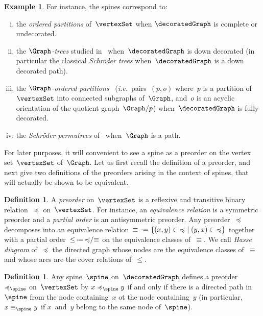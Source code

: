 \documentclass{amsart}
\theoremstyle{definition}
\newtheorem{definition}[theorem]{Definition}
\newtheorem{example}[theorem]{Example}
\newcommand{\set}[2]{\left\{ #1 \;\middle|\; #2 \right\}} %
\newcommand{\eqdef}{\mbox{\,\raisebox{0.2ex}{\scriptsize\ensuremath{\mathrm:}}\ensuremath{=}\,}} %
\newcommand{\ie}{\textit{i.e.}~} %
\newcommand{\darkblue}{\color{darkblue}} %
\newcommand{\defn}[1]{\textsl{\darkblue #1}} %
\newcommand{\vincent}[1]{\todo[color=blue!30]{#1 \\ \hfill --- V.}}
\begin{document}
\begin{example}
  \label{exm:spines}
  For instance, the spines correspond to:
  \vincent{todo: other ideas?}
  \begin{enumerate}[(i)]
    \item the \defn{ordered partitions} of~$\vertexSet$ when $\decoratedGraph$ is complete or undecorated.
    \item the \defn{$\Graph$-trees} studied in~\cite{Postnikov} when~$\decoratedGraph$ is down decorated (in particular the classical \defn{Schr\"oder trees} when~$\decoratedGraph$ is a down decorated path).
    \item the \defn{$\Graph$-ordered partitions}~\cite{Pilaud-acyclicReorientationLattices} (\ie pairs~$(p,o)$ where~$p$ is a partition of~$\vertexSet$ into connected subgraphs of~$\Graph$, and~$o$ is an acyclic orientation of the quotient graph~$\Graph/p$) when~$\decoratedGraph$ is fully decorated.
    \item the \defn{Schr\"oder permutrees} of~\cite{PilaudPons-permutrees} when~$\Graph$ is a path.
  \end{enumerate}
\end{example}

For later purposes, it will convenient to see a spine as a preorder on the vertex set~$\vertexSet$ of~$\Graph$.
Let us first recall the definition of a preorder, and next give two definitions of the preorders arising in the context of spines, that will actually be shown to be equivalent.

\begin{definition}
  \label{def:preorder}
  A \defn{preorder} on~$\vertexSet$ is a reflexive and transitive binary relation~$\preccurlyeq$ on~$\vertexSet$.
  For instance, an \defn{equivalence relation} is a symmetric preorder and a \defn{partial order} is an antisymmetric preorder.
  Any preorder~$\preccurlyeq$ decomposes into an equivalence relation~$\equiv \eqdef \set{(x,y) \in {\preccurlyeq}}{(y,x) \in {\preccurlyeq}}$ together with a partial order~${\le} \eqdef {\preccurlyeq}/{\equiv}$ on the equivalence classes of~$\equiv$.
  We call \defn{Hasse diagram} of~$\preccurlyeq$ the directed graph whose nodes are the equivalence classes of~$\equiv$ and whose arcs are the cover relations of~$\le$.
\end{definition}

\begin{definition}
  \label{def:spinePreorder1}
  Any spine~$\spine$ on~$\decoratedGraph$ defines a preorder~$\preccurlyeq_{\spine}$ on~$\vertexSet$ by $x \preccurlyeq_{\spine} y$ if and only if there is a directed path in~$\spine$ from the node containing~$x$ ot the node containing~$y$ (in particular, $x \equiv_{\spine} y$ if $x$~and~$y$ belong to the same node of~$\spine$).
\end{definition}
\end{document}
